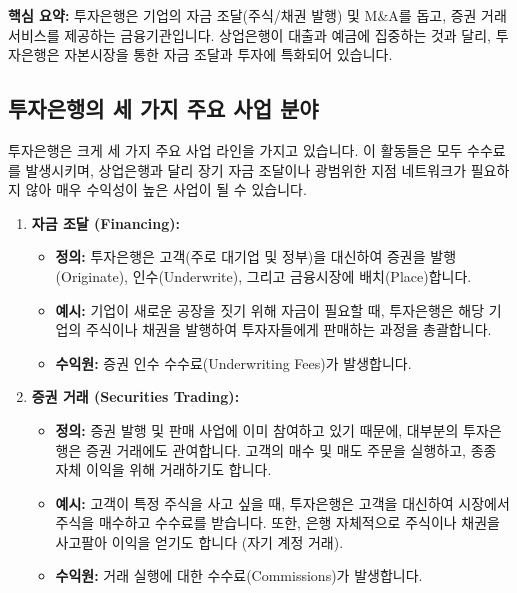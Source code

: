 \documentclass[11pt,a4paper]{article}
\begin{document}
\begin{summarybox}
\textbf{핵심 요약:} 투자은행은 기업의 자금 조달(주식/채권 발행) 및 M\&A를 돕고, 증권 거래 서비스를 제공하는 금융기관입니다. 상업은행이 대출과 예금에 집중하는 것과 달리, 투자은행은 자본시장을 통한 자금 조달과 투자에 특화되어 있습니다.
\end{summarybox}

\subsection{투자은행의 세 가지 주요 사업 분야}
투자은행은 크게 세 가지 주요 사업 라인을 가지고 있습니다. 이 활동들은 모두 수수료를 발생시키며, 상업은행과 달리 장기 자금 조달이나 광범위한 지점 네트워크가 필요하지 않아 매우 수익성이 높은 사업이 될 수 있습니다.

\begin{enumerate}
    \item \textbf{자금 조달 (Financing):}
    \begin{itemize}
        \item \textbf{정의:} 투자은행은 고객(주로 대기업 및 정부)을 대신하여 증권을 발행(Originate), 인수(Underwrite), 그리고 금융시장에 배치(Place)합니다.
        \item \textbf{예시:} 기업이 새로운 공장을 짓기 위해 자금이 필요할 때, 투자은행은 해당 기업의 주식이나 채권을 발행하여 투자자들에게 판매하는 과정을 총괄합니다.
        \item \textbf{수익원:} 증권 인수 수수료(Underwriting Fees)가 발생합니다.
    \end{itemize}

    \item \textbf{증권 거래 (Securities Trading):}
    \begin{itemize}
        \item \textbf{정의:} 증권 발행 및 판매 사업에 이미 참여하고 있기 때문에, 대부분의 투자은행은 증권 거래에도 관여합니다. 고객의 매수 및 매도 주문을 실행하고, 종종 자체 이익을 위해 거래하기도 합니다.
        \item \textbf{예시:} 고객이 특정 주식을 사고 싶을 때, 투자은행은 고객을 대신하여 시장에서 주식을 매수하고 수수료를 받습니다. 또한, 은행 자체적으로 주식이나 채권을 사고팔아 이익을 얻기도 합니다 (자기 계정 거래).
        \item \textbf{수익원:} 거래 실행에 대한 수수료(Commissions)가 발생합니다.
    \end{itemize}


\end{enumerate}
\end{document}
